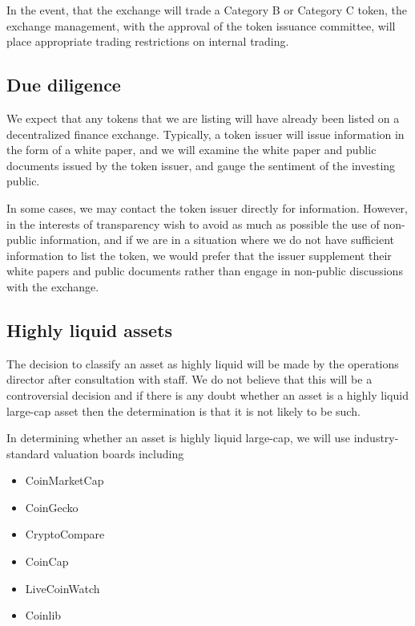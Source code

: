 In the event, that the exchange will trade a Category B or Category C
token, the exchange management, with the approval of the token issuance
committee, will place appropriate trading restrictions on internal
trading.


\subsection{Due diligence}

We expect that any tokens that we are listing will have already been
listed on a decentralized finance exchange.  Typically, a token issuer
will issue information in the form of a white paper, and we will
examine the white paper and public documents issued by the token
issuer, and gauge the sentiment of the investing public.

In some cases, we may contact the token issuer directly for
information.  However, in the interests of transparency wish to avoid
as much as possible the use of non-public information, and if we are
in a situation where we do not have sufficient information to list the
token, we would prefer that the issuer supplement their white papers
and public documents rather than engage in non-public discussions with
the exchange.

\subsection{Highly liquid assets}

The decision to classify an asset as highly liquid will be made by the
operations director after consultation with staff.  We do not believe
that this will be a controversial decision and if there is any doubt
whether an asset is a highly liquid large-cap asset then
the determination is that it is not likely to be such.

In determining whether an asset is highly liquid large-cap, we will
use industry-standard valuation boards including
\begin{itemize}
\item CoinMarketCap
\item CoinGecko
\item CryptoCompare
\item CoinCap
\item LiveCoinWatch
\item Coinlib
\end{itemize}

